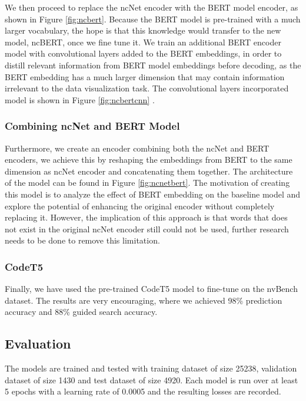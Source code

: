 \documentclass[
	a4paper, %
	10pt, %
	unnumberedsections, %
	twoside, %
]{t0003}
\begin{document}
We then proceed to replace the ncNet encoder with the BERT model encoder, as shown in Figure \ref{fig:ncbert}. Because the BERT model is pre-trained with a much larger vocabulary, the hope is that this knowledge would transfer to the new model, ncBERT, once we fine tune it. We train an additional BERT encoder model with convolutional layers added to the BERT embeddings, in order to distill relevant information from BERT model embeddings before decoding, as the BERT embedding has a much larger dimension that may contain information irrelevant to the data visualization task. The convolutional layers incorporated model is shown in Figure \ref{fig:ncbertcnn} .

\subsubsection{Combining ncNet and BERT Model}

Furthermore, we create an encoder combining both the ncNet and BERT encoders, we achieve this by reshaping the embeddings from BERT to the same dimension as ncNet encoder and concatenating them together. The architecture of the model can be found in Figure \ref{fig:ncnetbert}. The motivation of creating this model is to analyze the effect of BERT embedding on the baseline model and explore the potential of enhancing the original encoder without completely replacing it. However, the implication of this approach is that words that does not exist in the original ncNet encoder still could not be used, further research needs to be done to remove this limitation. 

\subsubsection{CodeT5}

Finally, we have used the pre-trained CodeT5 model to fine-tune on the nvBench dataset. The results are very encouraging, where we achieved 98\% prediction accuracy and 88\% guided search accuracy.

\subsection{Evaluation}

The models are trained and tested with training dataset of size 25238, validation dataset of size 1430 and test dataset of size 4920. Each model is run over at least 5 epochs with a learning rate of 0.0005 and the resulting losses are recorded.
\end{document}
